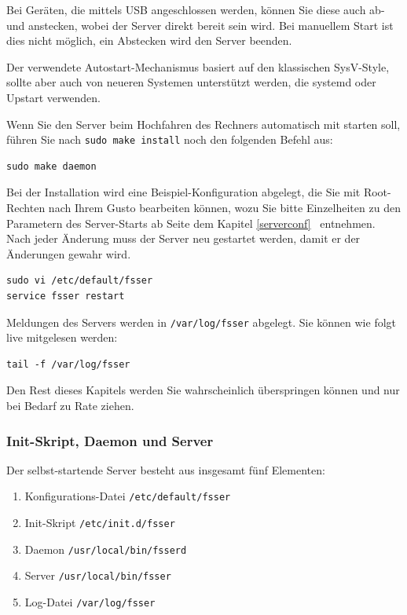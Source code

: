 \documentclass[10pt,a4paper]{scrartcl}		%
\begin{document}
Bei Geräten, die mittels USB angeschlossen werden,
können Sie diese auch ab- und anstecken, wobei der Server direkt bereit sein
wird. Bei manuellem Start ist dies nicht möglich, ein Abstecken wird den
Server beenden.

Der verwendete Autostart-Mechanismus basiert auf den klassischen SysV-Style,
sollte aber auch von neueren Systemen unterstützt werden, die systemd oder
Upstart verwenden.

Wenn Sie den Server beim Hochfahren des Rechners automatisch mit starten
soll, führen Sie nach \texttt{sudo make install} noch den folgenden Befehl aus:

\begin{verbatim}
sudo make daemon
\end{verbatim}

Bei der Installation wird eine Beispiel-Konfiguration abgelegt, die Sie
mit Root-Rechten nach Ihrem Gusto bearbeiten können, wozu Sie bitte
Einzelheiten zu den Parametern des Server-Starts ab Seite \pageref{serverconf}
dem Kapitel \glqq\ref{serverconf} \grqq\
entnehmen. Nach jeder Änderung muss der Server neu gestartet werden,
damit er der Änderungen gewahr wird.


\begin{verbatim}
sudo vi /etc/default/fsser
service fsser restart
\end{verbatim}

Meldungen des Servers werden in \texttt{/var/log/fsser}
abgelegt. Sie können wie folgt live mitgelesen werden:

\begin{verbatim}
tail -f /var/log/fsser
\end{verbatim}

Den Rest dieses Kapitels werden Sie wahrscheinlich überspringen können
und nur bei Bedarf zu Rate ziehen.

\clearpage
\subsubsection*{Init-Skript, Daemon und Server}
Der selbst-startende Server besteht aus insgesamt fünf Elementen:
\begin{enumerate}
\item Konfigurations-Datei \texttt{/etc/default/fsser}
\item Init-Skript \texttt{/etc/init.d/fsser}
\item Daemon \texttt{/usr/local/bin/fsserd}
\item Server \texttt{/usr/local/bin/fsser}
\item Log-Datei \texttt{/var/log/fsser}
\end{enumerate}
\end{document}
